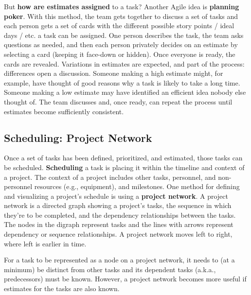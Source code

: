 But \textbf{how are estimates assigned} to a task? Another Agile idea is \textbf{planning poker}. With this method, the team gets together to discuss a set of tasks and each person gets a set of cards with the different possible story points / ideal days / etc. a task can be assigned. One person describes the task, the team asks questions as needed, and then each person privately decides on an estimate by selecting a card (keeping it face-down or hidden). Once everyone is ready, the cards are revealed. Variations in estimates are expected, and part of the process: differences open a discussion. Someone making a high estimate might, for example, have thought of good reasons why a task is likely to take a long time. Someone making a low estimate may have identified an efficient idea nobody else thought of. The team discusses and, once ready, can repeat the process until estimates become sufficiently consistent.

\subsection{Scheduling: Project Network}

Once a set of tasks has been defined, prioritized, and estimated, those tasks can be scheduled. \textbf{Scheduling} a task is placing it within the timeline and context of a project. The context of a project includes other tasks, personnel, and non-personnel resources (e.g., equipment), and milestones. One method for defining and visualizing a project's schedule is using a \textbf{project network}. A project network is a directed graph showing a project's tasks, the sequence in which they're to be completed, and the dependency relationships between the tasks. The nodes in the digraph represent tasks and the lines with arrows represent dependency or sequence relationships. A project network moves left to right, where left is earlier in time.

\marginpar{\projectNetworkDef\margindivider}
For a task to be represented as a node on a project network, it needs to (at a minimum) be distinct from other tasks and its dependent tasks (a.k.a., predecessors) must be known. However, a project network becomes more useful if estimates for the tasks are also known.

